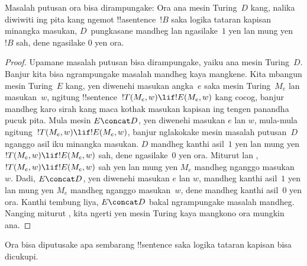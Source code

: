\documentclass[../../../include/open-logic-section]{subfiles}
\begin{document}

\begin{thm}
Masalah putusan ora bisa dirampungake: Ora ana mesin Turing~$D$
kang, nalika diwiwiti ing pita kang ngemot
!!a{sentence}~$!B$ saka logika tataran kapisan minangka masukan,
$D$~pungkasane mandheg lan ngasilake~$1$ yen lan mung yen
$!B$ sah, dene ngasilake $0$ yen ora.
\end{thm}

\begin{proof}
Upamane masalah putusan bisa dirampungake, yaiku ana
mesin Turing~$D$. Banjur kita bisa ngrampungake masalah
mandheg kaya mangkene. Kita mbangun mesin Turing~$E$ kang,
yen diwenehi masukan angka~$e$ saka mesin Turing~$M_e$
lan masukan~$w$, ngitung !!{sentence}~$!T(M_e, w) \lif !E(M_e, w)$
kang cocog, banjur mandheg karo sirah kang maca kothak
masukan kapisan ing tengen panandha pucuk pita. Mula mesin $E \concat D$, yen diwenehi
masukan $e$ lan $w$, mula-mula ngitung~$!T(M_e, w) \lif
!E(M_e, w)$, banjur nglakokake mesin masalah putusan~$D$
nganggo asil iku minangka masukan. $D$ mandheg kanthi asil~$1$
yen lan mung yen $!T(M_e, w) \lif !E(M_e, w)$ sah,
dene ngasilake~$0$ yen ora. Miturut
 lan
, $!T(M_e, w) \lif !E(M_e, w)$
sah yen lan mung yen $M_e$ mandheg nganggo masukan~$w$.
Dadi, $E\concat D$, yen diwenehi masukan $e$ lan $w$,
mandheg kanthi asil~$1$ yen lan mung yen $M_e$
mandheg nganggo masukan~$w$, dene mandheg kanthi
asil~$0$ yen ora. Kanthi tembung liya,
$E \concat D$ bakal ngrampungake masalah mandheg.
Nanging miturut ,
kita ngerti yen mesin Turing kaya mangkono ora mungkin ana.
\end{proof}

\begin{cor}%
Ora bisa diputusake apa sembarang !!{sentence}
saka logika tataran kapisan bisa dicukupi.
\end{cor}
\end{document}
